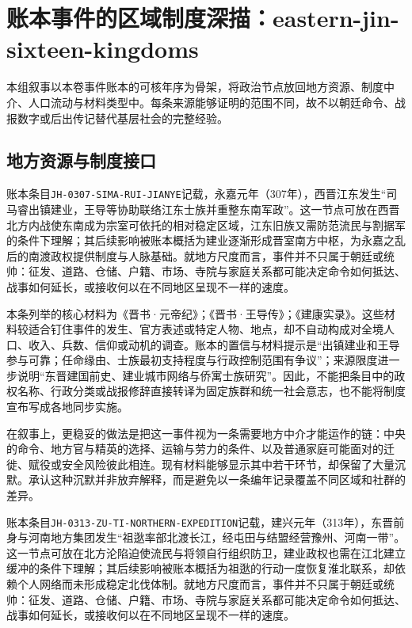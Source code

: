 \section{账本事件的区域制度深描：eastern-jin-sixteen-kingdoms}

\label{sec:ledger-depth-eastern-jin-sixteen-kingdoms}

本组叙事以本卷事件账本的可核年序为骨架，将政治节点放回地方资源、制度中介、人口流动与材料类型中。每条来源能够证明的范围不同，故不以朝廷命令、战报数字或后出传记替代基层社会的完整经验。

\subsection{地方资源与制度接口}

账本条目\texttt{JH-0307-SIMA-RUI-JIANYE}记载，永嘉元年（307年），西晋江东发生“司马睿出镇建业，王导等协助联络江东士族并重整东南军政”。这一节点可放在西晋北方内战使东南成为宗室可依托的相对稳定区域，江东旧族又需防范流民与割据军的条件下理解；其后续影响被账本概括为建业逐渐形成晋室南方中枢，为永嘉之乱后的南渡政权提供制度与人脉基础。就地方尺度而言，事件并不只属于朝廷或统帅：征发、道路、仓储、户籍、市场、寺院与家庭关系都可能决定命令如何抵达、战事如何延长，或接收何以在不同地区呈现不一样的速度。

本条列举的核心材料为《晋书·元帝纪》；《晋书·王导传》；《建康实录》。这些材料较适合钉住事件的发生、官方表述或特定人物、地点，却不自动构成对全境人口、收入、兵数、信仰或动机的调查。账本的置信与材料提示是“出镇建业和王导参与可靠；任命缘由、士族最初支持程度与行政控制范围有争议”；来源限度进一步说明“东晋建国前史、建业城市网络与侨寓士族研究”。因此，不能把条目中的政权名称、行政分类或战报修辞直接转译为固定族群和统一社会意志，也不能将制度宣布写成各地同步实施。

在叙事上，更稳妥的做法是把这一事件视为一条需要地方中介才能运作的链：中央的命令、地方官与精英的选择、运输与劳力的条件、以及普通家庭可能面对的迁徙、赋役或安全风险彼此相连。现有材料能够显示其中若干环节，却保留了大量沉默。承认这种沉默并非放弃解释，而是避免以一条编年记录覆盖不同区域和社群的差异。

账本条目\texttt{JH-0313-ZU-TI-NORTHERN-EXPEDITION}记载，建兴元年（313年），东晋前身与河南地方集团发生“祖逖率部北渡长江，经屯田与结盟经营豫州、河南一带”。这一节点可放在北方沦陷迫使流民与将领自行组织防卫，建业政权也需在江北建立缓冲的条件下理解；其后续影响被账本概括为祖逖的行动一度恢复淮北联系，却依赖个人网络而未形成稳定北伐体制。就地方尺度而言，事件并不只属于朝廷或统帅：征发、道路、仓储、户籍、市场、寺院与家庭关系都可能决定命令如何抵达、战事如何延长，或接收何以在不同地区呈现不一样的速度。

